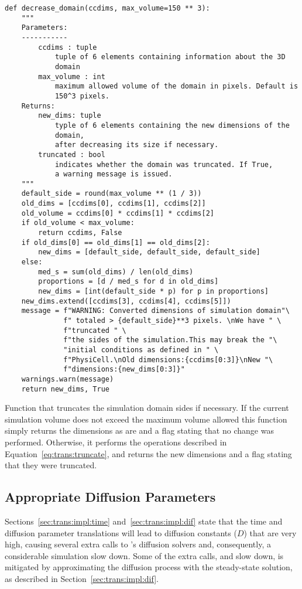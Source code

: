 \begin{listing}[H]%
\begin{verbatim}
def decrease_domain(ccdims, max_volume=150 ** 3):
    """
    Parameters:
    -----------
        ccdims : tuple
            tuple of 6 elements containing information about the 3D 
            domain
        max_volume : int
            maximum allowed volume of the domain in pixels. Default is 
            150^3 pixels.
    Returns:
        new_dims: tuple
            typle of 6 elements containing the new dimensions of the 
            domain,
            after decreasing its size if necessary.
        truncated : bool
            indicates whether the domain was truncated. If True, 
            a warning message is issued.
    """
    default_side = round(max_volume ** (1 / 3))
    old_dims = [ccdims[0], ccdims[1], ccdims[2]]
    old_volume = ccdims[0] * ccdims[1] * ccdims[2]
    if old_volume < max_volume:
        return ccdims, False
    if old_dims[0] == old_dims[1] == old_dims[2]:
        new_dims = [default_side, default_side, default_side]
    else:
        med_s = sum(old_dims) / len(old_dims)
        proportions = [d / med_s for d in old_dims]
        new_dims = [int(default_side * p) for p in proportions]
    new_dims.extend([ccdims[3], ccdims[4], ccdims[5]])
    message = f"WARNING: Converted dimensions of simulation domain"\
              f" totaled > {default_side}**3 pixels. \nWe have " \
              f"truncated " \
              f"the sides of the simulation.This may break the "\
              "initial conditions as defined in " \
              f"PhysiCell.\nOld dimensions:{ccdims[0:3]}\nNew "\
              f"dimensions:{new_dims[0:3]}"
    warnings.warn(message)
    return new_dims, True
\end{verbatim}
\caption{Function that truncates the simulation domain sides if necessary. If the current simulation volume does not exceed the maximum volume allowed this function simply returns the dimensions as are and a flag stating that no change was performed. Otherwise, it performs the operations described in Equation~\ref{eq:trans:truncate}, and returns the new dimensions and a flag stating that they were truncated.}\label{code:trans:trunc-space}
\end{listing}

\subsection{Appropriate Diffusion Parameters}\label{sec:trans:chal:time}
Sections~\ref{sec:trans:impl:time} and~\ref{sec:trans:impl:dif} state that the time and diffusion parameter translations will lead to diffusion constants ($D$) that are very high, causing several extra calls to \ccd's diffusion solvers and, consequently, a considerable simulation slow down. Some of the extra calls, and slow down, is mitigated by approximating the diffusion process with the steady-state solution, as described in Section~\ref{sec:trans:impl:dif}.

